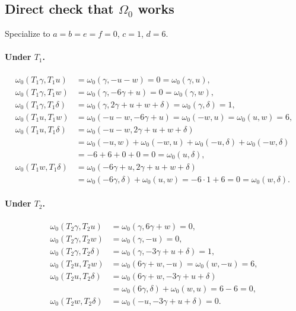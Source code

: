 \documentclass[11pt,a4paper]{article}
\theoremstyle{definition}
\theoremstyle{remark}
\begin{document}
\subsection{Direct check that $\Omega_0$ works}

Specialize to $a=b=e=f=0$, $c=1$, $d=6$.

\paragraph{Under $T_1$.}
\begin{align*}
\omega_0(T_1\gamma,T_1u)&=\omega_0(\gamma,-u-w)=0=\omega_0(\gamma,u),\\
\omega_0(T_1\gamma,T_1w)&=\omega_0(\gamma,-6\gamma+u)=0=\omega_0(\gamma,w),\\
\omega_0(T_1\gamma,T_1\delta)&=\omega_0(\gamma,2\gamma+u+w+\delta)=\omega_0(\gamma,\delta)=1,\\
\omega_0(T_1u,T_1w)&=\omega_0(-u-w,-6\gamma+u)=\omega_0(-w,u)=\omega_0(u,w)=6,\\
\omega_0(T_1u,T_1\delta)&=\omega_0(-u-w,2\gamma+u+w+\delta)\\
&=\omega_0(-u,w)+\omega_0(-w,u)+\omega_0(-u,\delta)+\omega_0(-w,\delta)\\
&=-6+6+0+0=0=\omega_0(u,\delta),\\
\omega_0(T_1w,T_1\delta)&=\omega_0(-6\gamma+u,2\gamma+u+w+\delta)\\
&=\omega_0(-6\gamma,\delta)+\omega_0(u,w)=-6\cdot 1+6=0=\omega_0(w,\delta).
\end{align*}

\paragraph{Under $T_2$.}
\begin{align*}
\omega_0(T_2\gamma,T_2u)&=\omega_0(\gamma,6\gamma+w)=0,\\
\omega_0(T_2\gamma,T_2w)&=\omega_0(\gamma,-u)=0,\\
\omega_0(T_2\gamma,T_2\delta)&=\omega_0(\gamma,-3\gamma+u+\delta)=1,\\
\omega_0(T_2u,T_2w)&=\omega_0(6\gamma+w,-u)=\omega_0(w,-u)=6,\\
\omega_0(T_2u,T_2\delta)&=\omega_0(6\gamma+w,-3\gamma+u+\delta)\\
&=\omega_0(6\gamma,\delta)+\omega_0(w,u)=6-6=0,\\
\omega_0(T_2w,T_2\delta)&=\omega_0(-u,-3\gamma+u+\delta)=0.
\end{align*}
\end{document}

